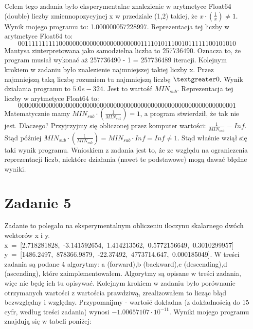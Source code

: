 \documentclass[]{article}
\begin{document}
	Celem tego zadania było eksperymentalne znalezienie w arytmetyce Float64 (double) liczby zmiennopozycyjnej x w przedziale (1,2) takiej, że \(x \cdot (\frac{1}{x}) \neq 1\). 
	Wynik mojego programu to: 1.000000057228997. Reprezentacja tej liczby w arytmetyce Float64 to: \newline 
	$$0 01111111111 0000000000000000000000001111010111001011111100101010$$
	Mantysa zinterpretowana jako samodzielna liczba to 257736490. Oznacza to, że program musiał wykonać aż 257736490 - 1 = 257736489 iteracji.
	Kolejnym krokiem w zadaniu było znalezienie najmniejszej takiej liczby x. Przez najmniejszą taką liczbę rozumiem tu najmniejszą liczbę $\textgreater 0$. Wynik działania programu to $5.0e-324$. Jest to wartość $MIN_{sub}$.  Reprezentacja tej liczby w arytmetyce Float64 to: \newline 
	$$0 00000000000 0000000000000000000000000000000000000000000000000001$$
	Matematycznie mamy \( MIN_{sub} \cdot (\frac{1}{MIN_{sub}}) = 1\), a program stwierdził, że tak nie jest. Dlaczego? Przyjrzyjmy się obliczonej przez komputer wartości: $\frac{1}{MIN_{sub}} = Inf$. Stąd później $MIN_{sub} \cdot(\frac{1}{MIN_{sub}}) = MIN_{sub} \cdot Inf = Inf \ne 1$. Stąd właśnie wziął się taki wynik programu. Wnioskiem z zadania jest to, że ze względu na ograniczenia reprezentacji liczb, niektóre działania (nawet te podstawowe) mogą dawać błędne wyniki.
	\clearpage
	
	\section*{Zadanie 5}
	Zadanie to polegało na eksperymentalnym obliczeniu iloczynu skalarnego dwóch wektorów x i y. \newline
	\mbox{x = [2.718281828, -3.141592654, 1.414213562, 0.5772156649, 0.3010299957]}\newline
	\mbox{y = [1486.2497, 878366.9879, -22.37492, 4773714.647, 0.000185049].}\newline
	W treści zadania są podane 4 algorytmy: \newline a (forward),b (backward),c (descending),d (ascending), które zaimplementowałem. Algorytmy są opisane w treści zadania, więc nie będę ich tu opisywać. Kolejnym krokiem w zadaniu było porównanie otrzymanych wartości z wartościa prawdziwą, zrealizowałem to licząc błąd bezwzględny i względny. Przypomnijmy - wartość dokładna (z dokładnością do 15 cyfr, według treści zadania) wynosi \(-1.00657107\cdot10^{-11}\). Wyniki mojego programu znajdują się w tabeli poniżej:
	
\end{document}
